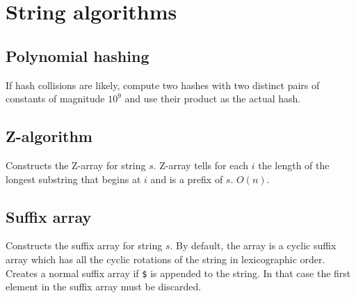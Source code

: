 \documentclass{article}
\begin{document}


\section {String algorithms}

\subsection {Polynomial hashing}

If hash collisions are likely, compute two hashes with two distinct pairs of constants of magnitude $10^9$ and use their product as the actual hash.



\subsection {Z-algorithm}

Constructs the Z-array for string $s$. Z-array tells for each $i$ the length of the longest substring that begins at $i$ and is a prefix of $s$. $O(n)$.



\subsection {Suffix array}

Constructs the suffix array for string $s$. By default, the array is a cyclic suffix array which has all the cyclic rotations of the string in lexicographic order. Creates a normal suffix array if \texttt{\$} is appended to the string. In that case the first element in the suffix array must be discarded.


\end{document}
